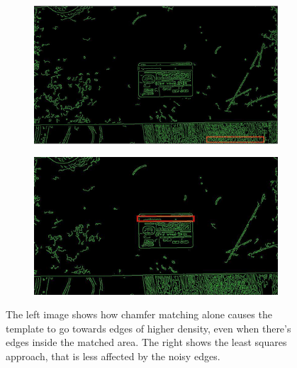 \documentclass[10pt,twocolumn,letterpaper]{article}
\begin{document}
\begin{figure}[t]
\begin{center}
\begin{subfigure}{.48\textwidth}
\begin{center}
	   \includegraphics[width=0.9\linewidth]{approach2}
\end{center}
\end{subfigure}
\begin{subfigure}{.48\textwidth}
\begin{center}
  	   \includegraphics[width=0.9\linewidth]{leastsquares}
\end{center}
\end{subfigure}
\end{center}
   \caption{The left image shows how chamfer matching alone causes the template to go towards edges of higher density, even when there's edges inside the matched area. The right shows the least squares approach, that is less affected by the noisy edges.}
\label{fig:high-density-edges}
\end{figure}
\end{document}
